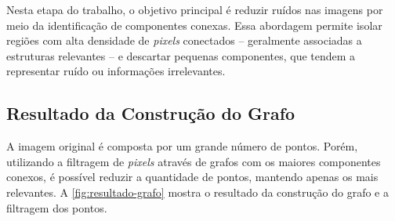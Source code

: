 
 Nesta etapa do trabalho, o objetivo principal é reduzir ruídos nas imagens por meio da identificação de componentes conexas. Essa abordagem permite isolar regiões com alta densidade de \textit{pixels} conectados -- geralmente associadas a estruturas relevantes -- e descartar pequenas componentes, que tendem a representar ruído ou informações irrelevantes.


\subsection{Resultado da Construção do Grafo}
\label{sec:resultado-construcao-grafo}

A imagem original é composta por um grande número de pontos. Porém, utilizando a filtragem de \textit{pixels} através de grafos com os maiores componentes conexos, é possível reduzir a quantidade de pontos, mantendo apenas os mais relevantes. A \autoref{fig:resultado-grafo} mostra o resultado da construção do grafo e a filtragem dos pontos.

